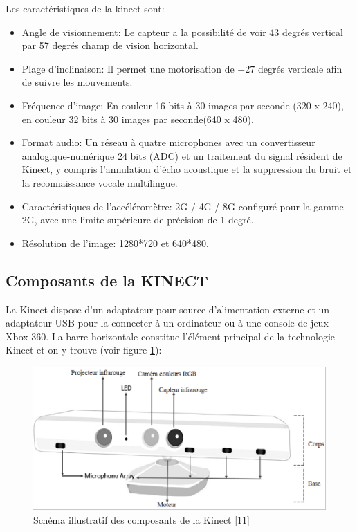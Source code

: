 \documentclass[12pt,a4paper,oneside]{book}
\begin{document}
	Les caractéristiques de la kinect sont:
	\begin{itemize}
		\item Angle de visionnement: Le capteur a la possibilité de  voir  43 degrés vertical par 57 degrés champ de vision horizontal.
		\item Plage d'inclinaison: Il permet une motorisation  de $\pm27$ degrés verticale afin de suivre les mouvements.
		\item Fréquence d'image: En couleur 16 bits à 30 images par seconde (320 x 240), en couleur 32 bits à 30 images par seconde(640 x 480).
		\item Format audio: Un réseau à quatre microphones avec un convertisseur analogique-numérique 24 bits (ADC) et un traitement du signal résident de Kinect, y compris l'annulation d'écho acoustique et la suppression du bruit et la reconnaissance vocale multilingue.
		\item Caractéristiques de l'accéléromètre: 2G / 4G / 8G configuré pour la gamme 2G, avec une limite supérieure de précision de 1 degré.
		\item Résolution de l'image: 1280*720 et 640*480.
	\end{itemize}
	
	\subsection{Composants de la KINECT}
	La Kinect dispose d’un adaptateur pour source d'alimentation externe et un adaptateur USB pour la connecter à un ordinateur ou à une console de jeux Xbox 360. La barre horizontale constitue l'élément principal de la technologie Kinect et on y trouve (voir figure \ref{fig14}):
	
	\begin{figure}[H]
		\centering
		\includegraphics[scale=0.7]{images/fonctionnementdepth3d.png}
		\caption{Schéma illustratif des composants de la Kinect \textcolor[rgb]{1.00,0.00,0.00}{[11]} }
		\label{fig14}
	\end{figure}
	
\end{document}
